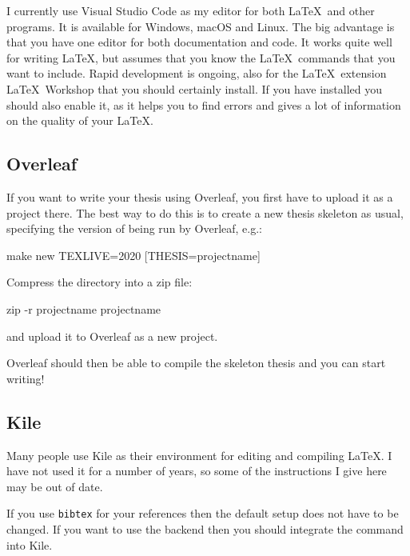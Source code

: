 I currently use Visual Studio Code as my editor for both \LaTeX\ and other programs.
It is available for Windows, macOS and Linux.
The big advantage is that you have one editor for both documentation and code.
It works quite well for writing \LaTeX,
but assumes that you know the \LaTeX\ commands that you want to include.
Rapid development is ongoing,
also for the \LaTeX\ extension \textsf{\LaTeX\ Workshop} that you should certainly install.
If you have  installed you should also enable it,
as it helps you to find errors 
and gives a lot of information on the quality of your \LaTeX.


\subsection{Overleaf}%
\label{sec:app:overleaf}

If you want to write your thesis using Overleaf,
you first have to upload it as a project there.
The best way to do this is to create a new thesis skeleton as usual,
specifying the version of \TeXLive being run by Overleaf, e.g.:
\begin{bashlisting}
make new TEXLIVE=2020 [THESIS=projectname]
\end{bashlisting}
\noindent Compress the directory into a zip file:
\begin{bashlisting}
  zip -r projectname projectname
\end{bashlisting}
\noindent and upload it to Overleaf as a new project.

Overleaf should then be able to compile the skeleton thesis and you can start writing!


\subsection{Kile}%
\label{sec:app:kubuntu:kile}

Many people use Kile as their environment for editing and compiling \LaTeX. 
I have not used it for a number of years,
so some of the instructions I give here may be out of date.

If you use \texttt{bibtex} for your references then the default
setup does not have to be changed. If you want to use the
 backend then you should integrate the
command into Kile.

